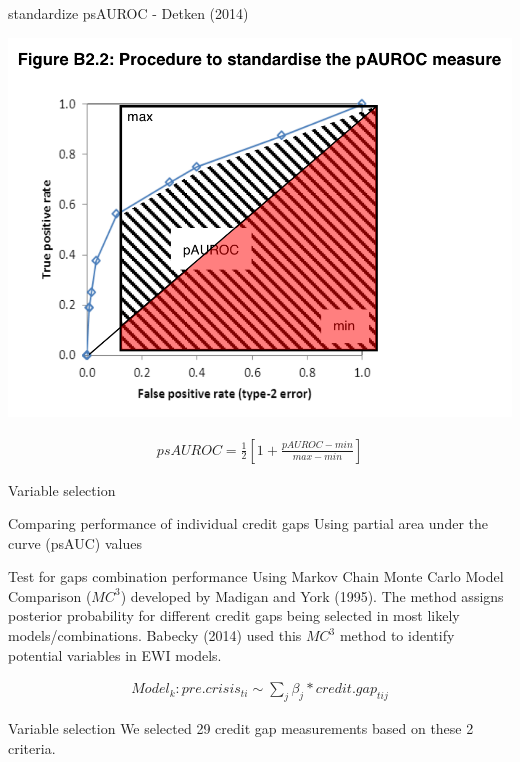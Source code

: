 \documentclass[
  ignorenonframetext,
]{beamer}
\begin{document}
\begin{frame}{standardize psAUROC - Detken (2014)}
\protect\hypertarget{standardize-psauroc---detken-2014}{}
\begin{center}\includegraphics[width=0.7\linewidth]{Data/pAUC} \end{center}

\begin{align}
psAUROC = \frac{1}{2}\left[ 1+ \frac{pAUROC - min}{max - min}\right]
\end{align}
\end{frame}

\begin{frame}{Variable selection}
\protect\hypertarget{variable-selection}{}
\begin{block}{Comparing performance of individual credit gaps}
\protect\hypertarget{comparing-performance-of-individual-credit-gaps}{}
Using partial area under the curve (psAUC) values
\end{block}

\begin{block}{Test for gaps combination performance}
\protect\hypertarget{test-for-gaps-combination-performance}{}
Using Markov Chain Monte Carlo Model Comparison (\(MC^3\)) developed by
Madigan and York (1995). The method assigns posterior probability for
different credit gaps being selected in most likely models/combinations.
Babecky (2014) used this \(MC^3\) method to identify potential variables
in EWI models.

\begin{align*}
Model_k :  pre.crisis_{ti} \sim \sum\nolimits_j \beta_j * credit.gap_{tij}
\end{align*}
\end{block}

\begin{block}{Variable selection}
\protect\hypertarget{variable-selection-1}{}
We selected 29 credit gap measurements based on these 2 criteria.
\end{block}
\end{frame}
\end{document}
